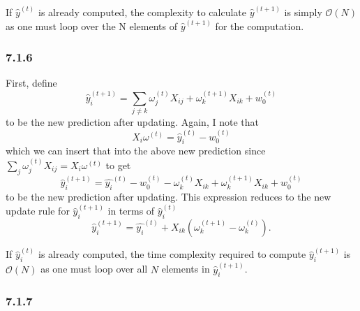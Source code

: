 \documentclass[12pt]{amsart}
\begin{document}
If $\hat{y}^{(t)}$ is already computed, the complexity to calculate $\hat{y}^{(t+1)}$ is simply $\mathcal{O}(N)$ as one must loop over the N elements of $\hat{y}^{(t+1)}$ for the computation.

\subsubsection*{7.1.6}

First, define
\begin{equation}
\hat{y}_i^{(t+1)} = \sum_{j \neq k} \omega_j^{(t)}X_{ij} + \omega_k^{(t+1)}X_{ik} + w_0^{(t)}
\end{equation}
to be the new prediction after updating.
Again, I note that 
\begin{equation}
X_i \omega^{(t)} = \hat{y}_i^{(t)} - w_0^{(t)}
\end{equation}
which we can insert that into the above new prediction since $\sum_{j} \omega_j^{(t)}X_{ij} = X_i \omega^{(t)} $ to get 
\begin{equation}
\hat{y}_i^{(t+1)} = \hat{y_i}^{(t)} - w_0^{(t)} - \omega_k^{(t)}X_{ik} + \omega_k^{(t+1)}X_{ik} + w_0^{(t)}
\end{equation}
to be the new prediction after updating.  This expression reduces to the new update rule for $\hat{y}_i^{(t+1)}$ in terms of $\hat{y}_i^{(t)}$
\begin{equation}
\hat{y}_i^{(t+1)} = \hat{y_i}^{(t)} + X_{ik}(\omega_k^{(t+1)} - \omega_k^{(t)}).
\end{equation}

If $\hat{y}_i^{(t)}$ is already computed, the time complexity required to compute $\hat{y}_i^{(t+1)}$ is $\mathcal{O}(N)$ as one must loop over all $N$ elements in $\hat{y}_i^{(t+1)}$.

\subsubsection*{7.1.7}
\end{document}
